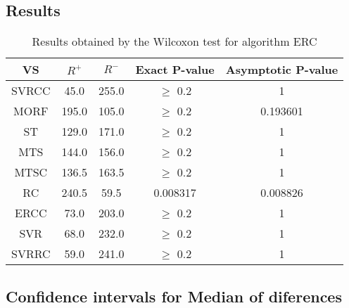 \documentclass[a4paper,10pt]{article}
\begin{document}
\subsection{Results}

\begin{table}[!htp]
\centering\small
\begin{tabular}{
|c|c|c|c|c|}
\hline
 VS & $R^{+}$ & $R^{-}$ & Exact P-value & Asymptotic P-value \\ \hline 
SVRCC & 45.0 & 255.0 & $\geq$ 0.2 & 1\\ \hline 
MORF & 195.0 & 105.0 & $\geq$ 0.2 & 0.193601\\ \hline 
ST & 129.0 & 171.0 & $\geq$ 0.2 & 1\\ \hline 
MTS & 144.0 & 156.0 & $\geq$ 0.2 & 1\\ \hline 
MTSC & 136.5 & 163.5 & $\geq$ 0.2 & 1\\ \hline 
RC & 240.5 & 59.5 & 0.008317 & 0.008826\\ \hline 
ERCC & 73.0 & 203.0 & $\geq$ 0.2 & 1\\ \hline 
SVR & 68.0 & 232.0 & $\geq$ 0.2 & 1\\ \hline 
SVRRC & 59.0 & 241.0 & $\geq$ 0.2 & 1\\ \hline 

\end{tabular}
\caption{Results obtained by the Wilcoxon test for algorithm ERC}
\end{table}

\subsection{Confidence intervals for Median of diferences}
\end{document}
